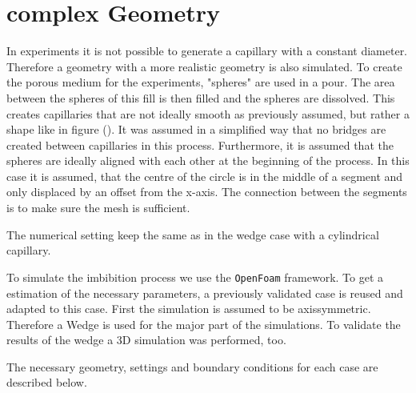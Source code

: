 \section{complex Geometry}
In experiments it is not possible to generate a capillary with a constant diameter. Therefore a geometry with a more realistic geometry is also simulated. To create the porous medium for the experiments, "spheres" are used in a pour. The area between the spheres of this fill is then filled and the spheres are dissolved. This creates capillaries that are not ideally smooth as previously assumed, but rather a shape like in figure (). It was assumed in a simplified way that no bridges are created between capillaries in this process. Furthermore, it is assumed that the spheres are ideally aligned with each other at the beginning of the process.   
In this case it is assumed, that the centre of the circle is in the middle of a segment and only displaced by an offset from the x-axis. The connection between the segments is to make sure the mesh is sufficient. 

The numerical setting keep the same as in the wedge case with a cylindrical capillary. 


To simulate the imbibition process we use the \texttt{OpenFoam} framework. To get a estimation of the necessary parameters, a previously validated case is reused and adapted to this case. First the simulation is assumed to be axissymmetric. Therefore a Wedge is used for the major part of the simulations. To validate the results of the wedge a 3D simulation was performed, too. 

The necessary geometry, settings and boundary conditions for each case are described below. 